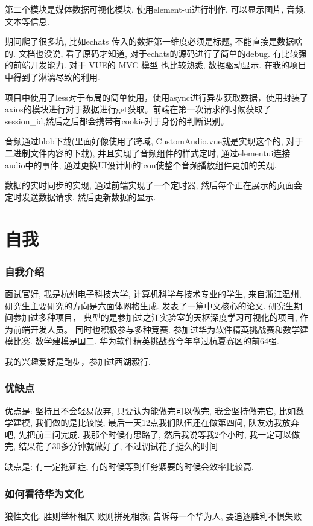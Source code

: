 \documentclass[UTF8]{ctexart}
\begin{document}
第二个模块是媒体数据可视化模块, 使用element-ui进行制作, 可以显示图片, 音频, 文本等信息. 

期间爬了很多坑, 比如echats 传入的数据第一维度必须是标题, 不能直接是数据啥的. 文档也没说, 看了原码才知道, 对于echats的源码进行了简单的debug. 有比较强的前端开发能力. 对于 VUE的  MVC 模型 也比较熟悉, 数据驱动显示. 在我的项目中得到了淋漓尽致的利用. 

项目中使用了less对于布局的简单使用，使用async进行异步获取数据，使用封装了axios的模块进行对于数据进行get获取。前端在第一次请求的时候获取了session\_id,然后之后都会携带有cookie对于身份的判断识别。

音频通过blob下载(里面好像使用了跨域, CustomAudio.vue就是实现这个的, 对于二进制文件内容的下载), 并且实现了音频组件的样式定时, 通过elementui连接audio中的事件,  通过更换UI设计师的icon使整个音频播放组件更加的美观.

数据的实时同步的实现, 通过前端实现了一个定时器, 然后每个正在展示的页面会定时发送数据请求, 然后更新数据的显示.
\section{自我}
\subsubsection{自我介绍}
面试官好, 我是杭州电子科技大学, 计算机科学与技术专业的学生, 来自浙江温州,
研究生主要研究的方向是六面体网格生成. 发表了一篇中文核心的论文.
研究生期间参加过多种项目， 典型的是参加过之江实验室的天枢深度学习可视化的项目, 作为前端开发人员。
同时也积极参与多种竞赛. 参加过华为软件精英挑战赛和数学建模比赛. 数学建模是国二. 华为软件精英挑战赛今年拿过杭夏赛区的前64强. \par
我的兴趣爱好是跑步，参加过西湖毅行.
\subsubsection{优缺点}
优点是: 坚持且不会轻易放弃, 只要认为能做完可以做完, 我会坚持做完它, 比如数学建模, 我们做的是比较慢, 最后一天12点我们队伍还在做第四问, 队友劝我放弃吧, 先把前三问完成. 我那个时候有思路了, 然后我说等我2个小时, 我一定可以做完, 结果花了30多分钟就做好了, 不过调试花了挺久的时间 

缺点是: 有一定拖延症, 有的时候等到任务紧要的时候会效率比较高.

\subsubsection{如何看待华为文化}
狼性文化, 胜则举杯相庆 败则拼死相救; 告诉每一个华为人, 要追逐胜利不惧失败
\end{document}
